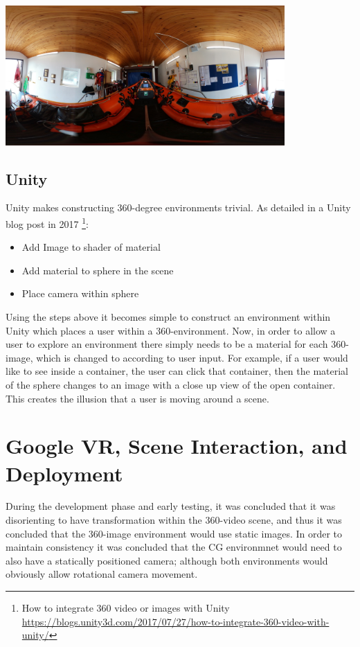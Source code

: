 \documentclass[a4paper, openright, twoside]{book}
\begin{document}
\begin{minipage}{\textwidth}
\hfill \break
\centering
\includegraphics[width=0.8\textwidth]{images/centre}
\label{model}
\hfill \break
\end{minipage}

\subsection{Unity}
Unity makes constructing 360-degree environments trivial. As detailed in a Unity blog post in 2017 \footnote{How to integrate 360 video or images with Unity \url{https://blogs.unity3d.com/2017/07/27/how-to-integrate-360-video-with-unity/}}: 

\begin{itemize}
\item Add Image to shader of material
\item Add material to sphere in the scene
\item Place camera within sphere
\end{itemize}

Using the steps above it becomes simple to construct an environment within Unity which places a user within a 360-environment. Now, in order to allow a user to explore an environment there simply needs to be a material for each 360-image, which is changed to according to user input. For example, if a user would like to see inside a container, the user can click that container, then the material of the sphere changes to an image with a close up view of the open container. This creates the illusion that a user is moving around a scene. 

\section{Google VR, Scene Interaction, and Deployment}
During the development phase and early testing, it was concluded that it was disorienting to have transformation within the 360-video scene, and thus it was concluded that the 360-image environment would use static images. In order to maintain consistency it was concluded that the CG environmnet would need to also have a statically positioned camera; although both environments would obviously allow rotational camera movement.  
\end{document}
